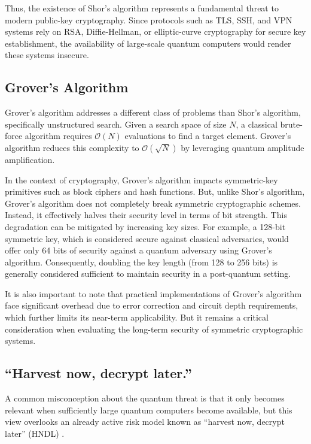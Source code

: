 Thus, the existence of Shor's algorithm represents a fundamental threat to modern public-key cryptography. Since protocols such as TLS, SSH, and VPN systems rely on RSA, Diffie-Hellman, or elliptic-curve cryptography for secure key establishment, the availability of large-scale quantum computers would render these systems insecure.

\subsection{Grover's Algorithm}
Grover's algorithm \cite{grovers} addresses a different class of problems than Shor's algorithm, specifically unstructured search. Given a search space of size $N$, a classical brute-force algorithm requires $\mathcal{O}(N)$ evaluations to find a target element. Grover's algorithm reduces this complexity to $\mathcal{O}(\sqrt{N})$ by leveraging quantum amplitude amplification.

In the context of cryptography, Grover's algorithm impacts symmetric-key primitives such as block ciphers and hash functions. But, unlike Shor's algorithm, Grover's algorithm does not completely break symmetric cryptographic schemes. Instead, it effectively halves their security level in terms of bit strength. This degradation can be mitigated by increasing key sizes. For example, a 128-bit symmetric key, which is considered secure against classical adversaries, would offer only 64 bits of security against a quantum adversary using Grover's algorithm. Consequently, doubling the key length (from 128 to 256 bits) is generally considered sufficient to maintain security in a post-quantum setting.

It is also important to note that practical implementations of Grover's algorithm face significant overhead due to error correction and circuit depth requirements, which further limits its near-term applicability. But it remains a critical consideration when evaluating the long-term security of symmetric cryptographic systems.

\subsection{``Harvest now, decrypt later.''} \label{hndl}
A common misconception about the quantum threat is that it only becomes relevant when sufficiently large quantum computers become available, but this view overlooks an already active risk model known as ``harvest now, decrypt later'' (HNDL) \cite{hndl}.

